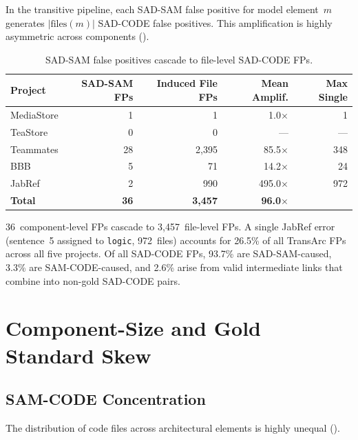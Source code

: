 \documentclass[11pt,a4paper]{report}
\newcommand{\sadcode}{SAD-CODE\xspace}
\newcommand{\sadsam}{SAD-SAM\xspace}
\newcommand{\samcode}{SAM-CODE\xspace}
\newcommand{\transarc}{TransArc\xspace}
\begin{document}
In the transitive pipeline, each \sadsam false positive for model element~$m$
generates $|\text{files}(m)|$ \sadcode false positives. This amplification is
highly asymmetric across components ().

\begin{table}[h]
\caption{\sadsam false positives cascade to file-level \sadcode FPs.}
\label{tab:amplification}
\centering\small
\begin{tabular}{lrrrr}
\toprule
\textbf{Project} & \textbf{\sadsam FPs} & \textbf{Induced File FPs} & \textbf{Mean Amplif.} & \textbf{Max Single} \\
\midrule
MediaStore  & 1  & 1     & 1.0$\times$   & 1   \\
TeaStore    & 0  & 0     & ---           & --- \\
Teammates   & 28 & 2,395 & 85.5$\times$  & 348 \\
BBB         & 5  & 71    & 14.2$\times$  & 24  \\
JabRef      & 2  & 990   & 495.0$\times$ & 972 \\
\midrule
\textbf{Total} & \textbf{36} & \textbf{3,457} & \textbf{96.0$\times$} & \\
\bottomrule
\end{tabular}
\end{table}

36~component-level FPs cascade to 3,457~file-level FPs. A single JabRef error
(sentence~5 assigned to \texttt{logic}, 972~files) accounts for 26.5\% of all
\transarc FPs across all five projects. Of all \sadcode FPs, 93.7\% are
\sadsam-caused, 3.3\% are \samcode-caused, and 2.6\% arise from valid
intermediate links that combine into non-gold \sadcode pairs.


\section{Component-Size and Gold Standard Skew}
\label{sec:ineq:skew}

\subsection{SAM-CODE Concentration}

The distribution of code files across architectural elements is highly unequal
().
\end{document}

